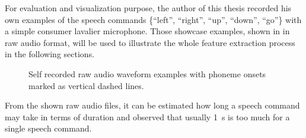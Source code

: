 For evaluation and visualization purpose, the author of this thesis recorded his own examples of the speech commands \{\enquote{left}, \enquote{right}, \enquote{up}, \enquote{down}, \enquote{go}\} with a simple consumer lavalier microphone.
Those showcase examples, shown in  in raw audio format, will be used to illustrate the whole feature extraction process in the following sections.
\begin{figure}[!ht]
  \centering
  \caption{Self recorded raw audio waveform examples with phoneme onsets marked as vertical dashed lines.}
  \label{fig:signal_raw_showcase}
\end{figure}
\FloatBarrier
\noindent
From the shown raw audio files, it can be estimated how long a speech command may take in terms of duration and observed that usually \SI{1}{\second} is too much for a single speech command.
